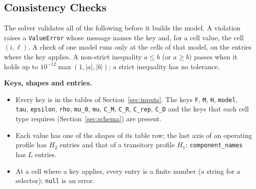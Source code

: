 \subsection{Consistency Checks}\label{sec:consistency_checks}

The solver validates all of the following before it builds the model.
A violation raises a \texttt{ValueError} whose message names the key and, for a cell value, the cell $(i,\ell)$.
A check of one model runs only at the cells of that model, on the entries where the key applies.
A non-strict inequality $a \le b$ (or $a \ge b$) passes when it holds up to $10^{-12}\max(1, |a|, |b|)$; a strict inequality has no tolerance.

\textbf{Keys, shapes and entries.}
\begin{itemize}[leftmargin=1.5em]
  \item Every key is in the tables of Section~\ref{sec:inputs}. The keys \texttt{F}, \texttt{M}, \texttt{H}, \texttt{model}, \texttt{tau}, \texttt{epsilon}, \texttt{rho}, \texttt{mu\_0}, \texttt{mu}, \texttt{C\_M}, \texttt{C\_R}, \texttt{C\_rep}, \texttt{C\_D} and the keys that each cell type requires (Section~\ref{sec:schema}) are present.
  \item Each value has one of the shapes of its table row; the last axis of an operating profile has $H_2$ entries and that of a transitory profile $H_1$; \texttt{component\_names} has $L$ entries.
  \item At a cell where a key applies, every entry is a finite number (a string for a selector); \texttt{null} is an error.
\end{itemize}

